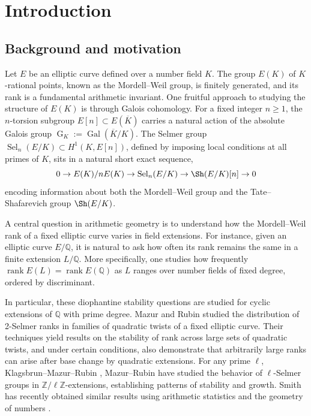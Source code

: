 \documentclass[11pt,reqno]{amsart}
\newcommand{\Q}{\mathbb{Q}}
\newcommand{\op}[1]{\operatorname{#1}}
\numberwithin{equation}{section}
\begin{document}
\subjclass[2010]{}
\keywords{}

\maketitle

\section{Introduction}
\label{section:intro}

\subsection{Background and motivation}
\par Let \( E \) be an elliptic curve defined over a number field \( K \). The group \( E(K) \) of \( K \)-rational points, known as the Mordell–Weil group, is finitely generated, and its rank is a fundamental arithmetic invariant. One fruitful approach to studying the structure of \( E(K) \) is through Galois cohomology. For a fixed integer \( n \geq 1 \), the \( n \)-torsion subgroup \( E[n] \subset E(\overline{K}) \) carries a natural action of the absolute Galois group \( \operatorname{G}_K := \operatorname{Gal}(\overline{K}/K) \). The Selmer group \( \operatorname{Sel}_n(E/K) \subset H^1(K, E[n]) \), defined by imposing local conditions at all primes of \( K \), sits in a natural short exact sequence,\[0\rightarrow E(K)/nE(K)\rightarrow \op{Sel}_n(E/K)\rightarrow \Sh(E/K)[n]\rightarrow 0\]
encoding information about both the Mordell–Weil group and the Tate–Shafarevich group \( \Sh(E/K) \).

\par A central question in arithmetic geometry is to understand how the Mordell–Weil rank of a fixed elliptic curve varies in field extensions. For instance, given an elliptic curve \( E/\mathbb{Q} \), it is natural to ask how often its rank remains the same in a finite extension \( L/\mathbb{Q} \). More specifically, one studies how frequently \( \operatorname{rank} E(L) = \operatorname{rank} E(\mathbb{Q}) \) as \( L \) ranges over number fields of fixed degree, ordered by discriminant. 

\par In particular, these diophantine stability questions are studied for cyclic extensions of $\Q$ with prime degree. Mazur and Rubin \cite{MazurRubinQtwists} studied the distribution of 2-Selmer ranks in families of quadratic twists of a fixed elliptic curve. Their techniques yield results on the stability of rank across large sets of quadratic twists, and under certain conditions, also demonstrate that arbitrarily large ranks can arise after base change by quadratic extensions. For any prime \( \ell \), Klagsbrun--Mazur--Rubin \cite{KMR}, Mazur--Rubin \cite{mazur2018diophantine} have studied the behavior of \( \ell \)-Selmer groups in \( \mathbb{Z}/\ell\mathbb{Z} \)-extensions, establishing patterns of stability and growth. Smith has recently obtained similar results using arithmetic statistics and the geometry of numbers \cite{smith2022distribution1, smith2022distribution2}. 
\end{document}

